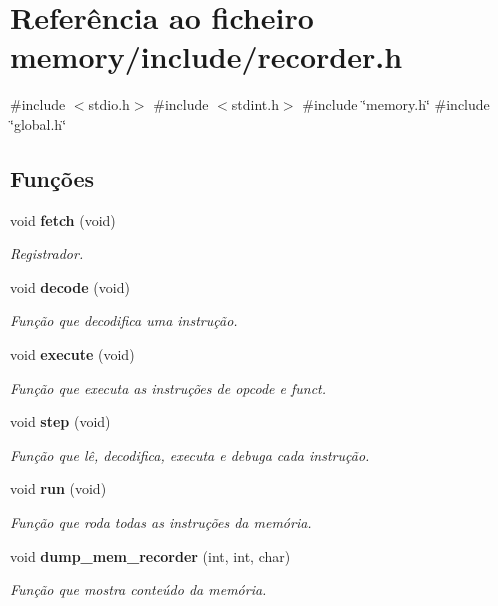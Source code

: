 \section{Referência ao ficheiro memory/include/recorder.h}
\label{recorder_8h}
{\ttfamily \#include $<$stdio.\+h$>$}\newline
{\ttfamily \#include $<$stdint.\+h$>$}\newline
{\ttfamily \#include \char`\"{}memory.\+h\char`\"{}}\newline
{\ttfamily \#include \char`\"{}global.\+h\char`\"{}}\newline
\subsection*{Funções}
\begin{DoxyCompactItemize}
\item 
void \textbf{ fetch} (void)
\begin{DoxyCompactList}\small\item\em Registrador. \end{DoxyCompactList}\item 
void \textbf{ decode} (void)
\begin{DoxyCompactList}\small\item\em Função que decodifica uma instrução. \end{DoxyCompactList}\item 
void \textbf{ execute} (void)
\begin{DoxyCompactList}\small\item\em Função que executa as instruções de opcode e funct. \end{DoxyCompactList}\item 
void \textbf{ step} (void)
\begin{DoxyCompactList}\small\item\em Função que lê, decodifica, executa e debuga cada instrução. \end{DoxyCompactList}\item 
void \textbf{ run} (void)
\begin{DoxyCompactList}\small\item\em Função que roda todas as instruções da memória. \end{DoxyCompactList}\item 
void \textbf{ dump\+\_\+mem\+\_\+recorder} (int, int, char)
\begin{DoxyCompactList}\small\item\em Função que mostra conteúdo da memória. \end{DoxyCompactList}\item 

\end{DoxyCompactItemize}
